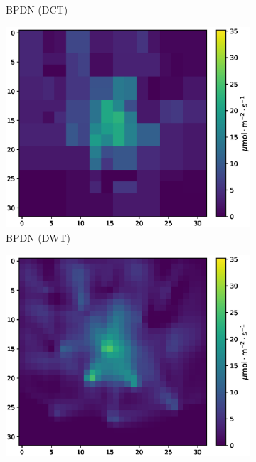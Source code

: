 \begin{figure}[htb]
\begin{minipage}[b]{\textwidth}
\begin{subfigure}[b]{0.32\textwidth}
            \caption{BPDN (DCT)}
        \end{subfigure}    
        \begin{subfigure}[b]{0.32\textwidth}
            \includegraphics[width=\textwidth]{figures/06_results/gaussian_plume_example/munich/bp_dwt_snr_20_db.eps}
            \caption{BPDN (DWT)}
        \end{subfigure}
        \begin{subfigure}[b]{0.32\textwidth}
            \includegraphics[width=\textwidth]{figures/06_results/gaussian_plume_example/munich/least_squares_snr_20_db.eps}

\end{subfigure}
\end{minipage}
\end{figure}
